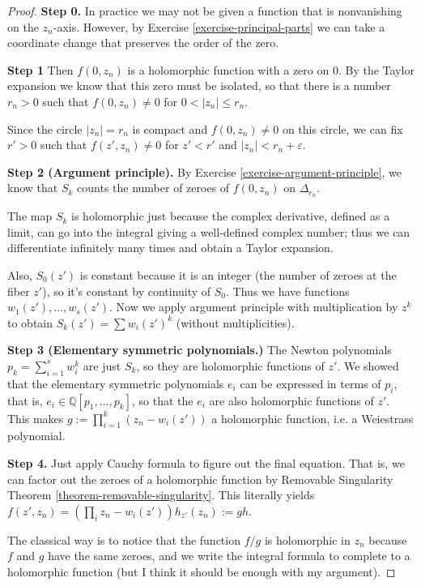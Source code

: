 \begin{proof}
{\bf Step 0.} In practice we may not be given a function that is nonvanishing on
the $z_n$-axis. However, by Exercise \ref{exercise-principal-parts} we can take
a coordinate change that preserves the order of the zero.

{\bf Step 1} Then $f(0,z_n)$ is a holomorphic function with a zero on $0$. By
the Taylor expansion we know that this zero must be isolated, so that there is a
number $r_n>0$ such that $f(0,z_n)\neq 0$ for  $0<|z_n|\leq r_n$.

Since the circle $|z_n|=r_n$ is compact and $f(0,z_n)\neq 0$ on this circle, we
can fix $r'>0$ such that $f(z',z_n)\neq 0$ for $z'<r'$ and $|z_n|<
r_n+\varepsilon$.

{\bf Step 2 (Argument principle).} By Exercise
\ref{exercise-argument-principle}, we know that $S_k$ counts the number of
zeroes of $f(0,z_n)$ on $\Delta_{r_n}$.

The map $S_k$ is holomorphic just because the
complex derivative, defined as a limit, can go into the integral giving a
well-defined complex number; thus we can differentiate infinitely many times and
obtain a Taylor expansion.

Also, $S_0(z')$ is constant because it is an integer (the number of zeroes at
the fiber $z'$), so it's constant by continuity of $S_0$. Thus we have functions
$w_1(z'),\ldots,w_s(z')$. Now we apply argument principle with multiplication by
$z^k$ to obtain $S_k(z')=\sum w_i(z')^k$ (without multiplicities).

{\bf Step 3 (Elementary symmetric polynomials.)} The Newton polynomials
$p_k=\sum_{i=1}^sw_i^k$ are just $S_k$, so they are holomorphic functions
of $z'$. We showed that the elementary symmetric polynomials $e_i$ can be
expressed in terms of $p_i$, that is, $e_i\in\mathbb{Q}[p_1,\ldots,p_k]$, so
that the $e_i$ are also holomorphic functions of $z'$. This makes 
$g:=\prod_{i=1}^k(z_n-w_i(z'))$ a holomorphic function, i.e. a Weiestrass
polynomial.

{\bf Step 4.} Just apply Cauchy formula to figure out
the final equation. That is, we can factor out the zeroes of a holomorphic
function by Removable Singularity Theorem \ref{theorem-removable-singularity}.
This literally yields
$f(z',z_n)=\left(\prod_{i}z_n-w_i(z')\right)h_{z'}(z_n):=gh$.

The classical way is to notice that the function $f/g$ is holomorphic in $z_n$
because $f$ and $g$ have the same zeroes, and we write the integral formula to
complete to a holomorphic function (but I think it should be enough with my
argument).
\end{proof}

